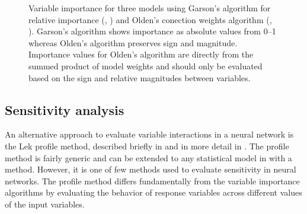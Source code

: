 \documentclass[article,shortnames]{jss}\usepackage[]{graphicx}\usepackage[]{color}
\begin{document}
\begin{figure}
{{}



\label{fig:plotimp4}
}

\caption{Variable importance for three models using Garson's algorithm for relative importance (, \citealt{Garson91,Goh95}) and Olden's conection weights algorithm (, \citealt{Olden04}).  Garson's algorithm shows importance as absolute values from 0--1 whereas Olden's algorithm preserves sign and magnitude.  Importance values for Olden's algorithm are directly from the summed product of model weights and should only be evaluated based on the sign and relative magnitudes between variables.}
\label{fig:plotimp}
\end{figure}

\subsection{Sensitivity analysis}

An alternative approach to evaluate variable interactions in a neural network is the Lek profile method, described briefly in \citet{Lek96} and in more detail in \citet{Gevrey03}. The profile method is fairly generic and can be extended to any statistical model in  with a  method. However, it is one of few methods used to evaluate sensitivity in neural networks.  The profile method differs fundamentally from the variable importance algorithms by evaluating the behavior of response variables across different values of the input variables.  
\end{document}
